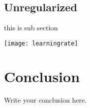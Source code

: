 \documentclass{article}
\begin{document}
\subsection{Unregularized}
this is sub section

\begin{center}
 \texttt{[image: learningrate]}
\end{center}


\section{Conclusion}
Write your conclusion here.
\end{document}
